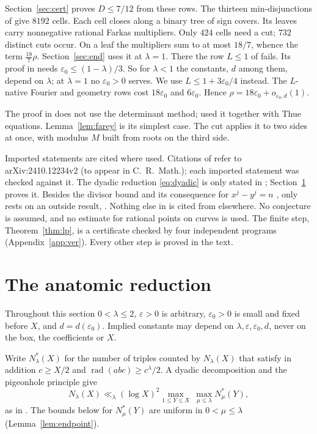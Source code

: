 \documentclass{amsart}
\numberwithin{equation}{section}
\numberwithin{table}{section}
\newcommand{\rad}{\operatorname{rad}}
\begin{document}
Section~\ref{sec:cert} proves $D\le7/12$ from these rows. The thirteen
min-disjunctions of \cite[Proposition~6.1]{BBLT} give $8192$ cells. Each cell
closes along a binary tree of sign covers. Its leaves carry nonnegative
rational Farkas multipliers. Only $424$ cells need a cut; $732$ distinct cuts
occur. On a leaf the multipliers sum to at most $18/7$, whence the term
$\tfrac{18}{7}\rho$. Section~\ref{sec:end} uses it at $\lambda=1$. There the
row $L\le1$ of \cite{BBLT} fails. Its proof in \cite[Theorem~1.3]{BBLT} needs
$\varepsilon_0\le(1-\lambda)/3$. So for $\lambda<1$ the constants, $d$ among
them, depend on $\lambda$; at $\lambda=1$ no $\varepsilon_0>0$ serves. We use
$L\le1+3\varepsilon_0/4$ instead. The $L$-native Fourier and geometry rows cost
$18\varepsilon_0$ and $6\varepsilon_0$. Hence
$\rho=18\varepsilon_0+o_{\varepsilon_0,d}(1)$.

The proof in \cite{BBLT} does not use the determinant method; \cite{BLT} used
it together with Thue equations. Lemma~\ref{lem:farey} is its simplest case. The cut
applies it to two sides at once, with modulus $M$ built from roots on the
third side.

Imported statements are cited where used. Citations of \cite{BBLT} refer to
arXiv:\allowbreak2410.12234v2 (to appear in C.~R.~Math.); each imported
statement was checked against it. The dyadic reduction \eqref{eq:dyadic} is
only stated in \cite[Section~2]{BBLT}; Section~\ref{sec:red} proves it.
Besides the divisor bound and its consequence for $x^j-y^j=n$
\cite[Propositions~2.3 and~3.1]{BBLT}, only \cite[Proposition~4.1]{BBLT}
rests on an outside result, \cite[Lemma~3]{HB}. Nothing else in
\cite[Sections~2--6]{BBLT} is cited from elsewhere. No conjecture is assumed,
and no estimate for rational points on curves is used. The finite step,
Theorem~\ref{thm:lp}, is a certificate checked by four independent programs
(Appendix~\ref{app:ver}). Every other step is proved in the text.


\section{The anatomic reduction}\label{sec:red}

Throughout this section $0<\lambda\le2$, $\varepsilon>0$ is arbitrary,
$\varepsilon_0>0$ is small and fixed before $X$, and $d=d(\varepsilon_0)$.
Implied constants may depend on $\lambda,\varepsilon,\varepsilon_0,d$, never on
the box, the coefficients or $X$.

Write $N^*_\lambda(X)$ for the number of triples counted by $N_\lambda(X)$ that
satisfy in addition $c\ge X/2$ and $\rad(abc)\ge c^{\lambda}/2$. A dyadic
decomposition and the pigeonhole principle give
\begin{equation}\label{eq:dyadic}
 N_\lambda(X)\ll_\lambda(\log X)^2\max_{1\le Y\le X}\ \max_{\mu\le\lambda}N^*_\mu(Y),
\end{equation}
as in \cite[Section~2]{BBLT}. The bounds below for $N^*_\mu(Y)$ are uniform
in $0<\mu\le\lambda$ (Lemma~\ref{lem:endpoint}).
\end{document}
